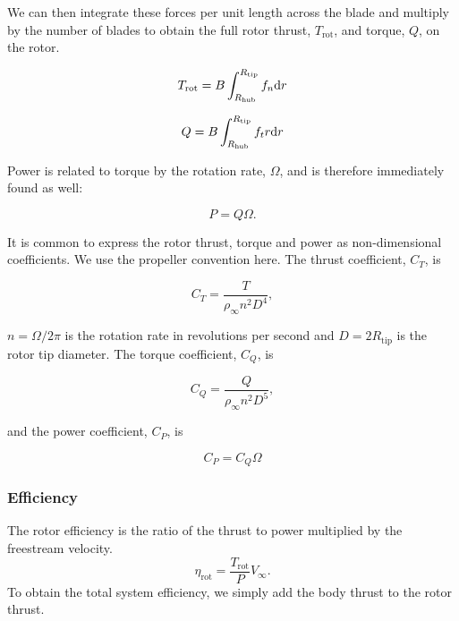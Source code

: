 \noindent We can then integrate these forces per unit length across the blade and multiply by the number of blades to obtain the full rotor thrust, \(T_\text{rot}\), and torque, \(Q\), on the rotor.

\begin{equation}
    T_\text{rot} = B \int_{R_\text{hub}}^{R_\text{tip}} f_n \mathrm{d} r
\end{equation}

\begin{equation}
    Q = B \int_{R_\text{hub}}^{R_\text{tip}} f_t r \mathrm{d} r
\end{equation}

\noindent Power is related to torque by the rotation rate, \(\Omega\), and is therefore immediately found as well:

\begin{equation}
    P = Q\Omega.
\end{equation}

It is common to express the rotor thrust, torque and power as non-dimensional coefficients.
%
We use the propeller convention here.
%
The thrust coefficient, \(C_T\), is

\begin{equation}
    C_T = \frac{T}{\rho_\infty n^2 D^4},
\end{equation}

\where \(n=\Omega/2\pi\) is the rotation rate in revolutions per second and \(D=2R_\text{tip}\) is the rotor tip diameter.
%
The torque coefficient, \(C_Q\), is

\begin{equation}
    C_Q = \frac{Q}{\rho_\infty n^2 D^5},
\end{equation}

\noindent and the power coefficient, \(C_P\), is

\begin{equation}
    C_P = C_Q \Omega
\end{equation}


\subsubsection{Efficiency}

The rotor efficiency is the ratio of the thrust to power multiplied by the freestream velocity.
%
\begin{equation}
    \eta_\text{rot} = \frac{T_\text{rot}}{P} V_\infty.
\end{equation}
%
To obtain the total system efficiency, we simply add the body thrust to the rotor thrust.


